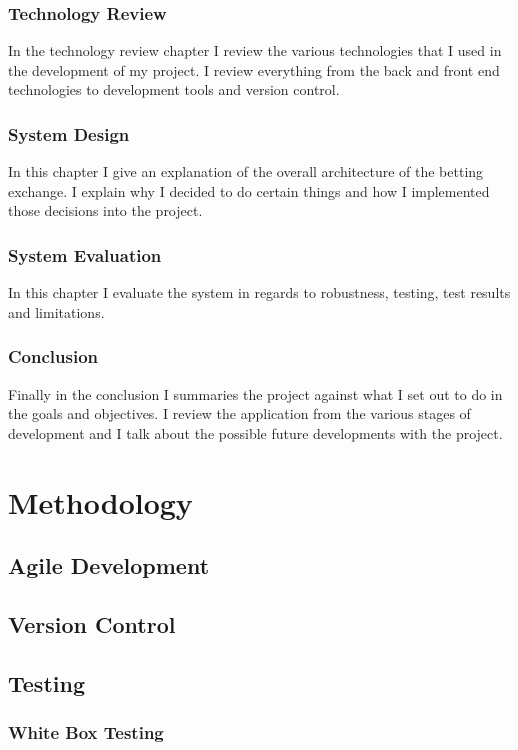 \subsection{Technology Review}
In the technology review chapter I review the various technologies that I used in the development of my project. I review everything from the back and front end technologies to development tools and version control.

\subsection{System Design}
In this chapter I give an explanation of the overall architecture of the betting exchange. I explain why I decided to do certain things and how I implemented those decisions into the project.
\subsection{System Evaluation}
In this chapter I evaluate the system in regards to robustness, testing, test results and limitations. 

\subsection{Conclusion}
Finally in the conclusion I summaries the project against what I set out to do in the goals and objectives. I review the application from the various stages of development and I talk about the possible future developments with the project.

\chapter{Methodology}
\section{Agile Development}

\section{Version Control}

\section{Testing}
\subsection{White Box Testing}
